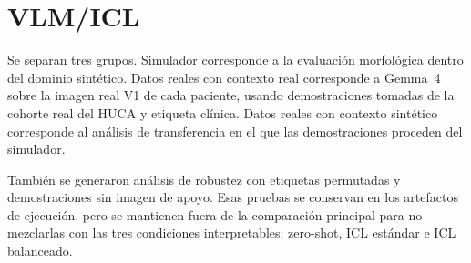 \section{VLM/ICL}

Se separan tres grupos. Simulador corresponde a la evaluación morfológica dentro del dominio sintético. Datos reales con contexto real corresponde a Gemma~4 sobre la imagen real V1 de cada paciente, usando demostraciones tomadas de la cohorte real del HUCA y etiqueta clínica. Datos reales con contexto sintético corresponde al análisis de transferencia en el que las demostraciones proceden del simulador.

También se generaron análisis de robustez con etiquetas permutadas y demostraciones sin imagen de apoyo. Esas pruebas se conservan en los artefactos de ejecución, pero se mantienen fuera de la comparación principal para no mezclarlas con las tres condiciones interpretables: zero-shot, ICL estándar e ICL balanceado.

